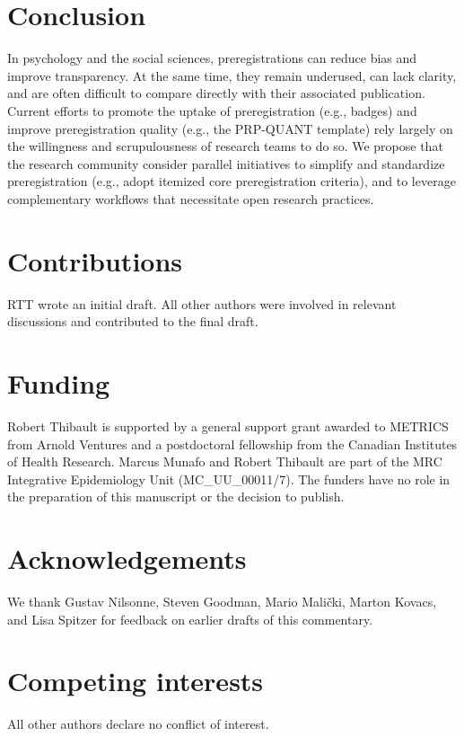 \documentclass[authordate, meta]{jote-new-article}
\begin{document}
\section{Conclusion}



In psychology and the social sciences, preregistrations can reduce bias and improve transparency. At the same time, they remain underused, can lack clarity, and are often difficult to compare directly with their associated publication. Current efforts to promote the uptake of preregistration (e.g., badges) and improve preregistration quality (e.g., the PRP-QUANT template) rely largely on the willingness and scrupulousness of research teams to do so. We propose that the research community consider parallel initiatives to simplify and standardize preregistration (e.g., adopt itemized core preregistration criteria), and to leverage complementary workflows that necessitate open research practices.







\section{Contributions}



RTT wrote an initial draft. All other authors were involved in relevant discussions and contributed to the final draft.







\section{Funding}



Robert Thibault is supported by a general support grant awarded to METRICS from Arnold Ventures and a postdoctoral fellowship from the Canadian Institutes of Health Research. Marcus Munafo and Robert Thibault are part of the MRC Integrative Epidemiology Unit (MC\_UU\_00011/7). The funders have no role in the preparation of this manuscript or the decision to publish.







\section{Acknowledgements}



We thank Gustav Nilsonne, Steven Goodman, Mario Malički, Marton Kovacs, and Lisa Spitzer for feedback on earlier drafts of this commentary.







\section{Competing interests}



All other authors declare no conflict of interest.




\nocite{*}


\printbibliography
\end{document}

